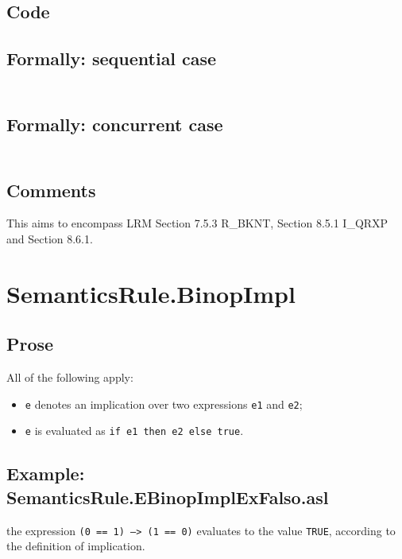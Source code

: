 \documentclass{book}
\begin{document}
  \subsection{Code}

  \subsection{Formally: sequential case}
  \begin{align}
  \end{align} 

  \subsection{Formally: concurrent case}
  \begin{align}
  \end{align} 

  \subsection{Comments}
  This aims to encompass LRM Section 7.5.3 R\_BKNT, Section 8.5.1 I\_QRXP and Section
  8.6.1.

\section{SemanticsRule.BinopImpl \label{sec:SemanticsRule.BinopImpl}}

  \subsection{Prose}
  All of the following apply:
  \begin{itemize}
  \item \texttt{e} denotes an implication over two expressions \texttt{e1} and \texttt{e2};
  \item \texttt{e} is evaluated as \texttt{if e1 then e2 else true}.
  \end{itemize}

  \subsection{Example: SemanticsRule.EBinopImplExFalso.asl}
the expression \texttt{(0 == 1) --> (1 == 0)} evaluates to the value \texttt{TRUE}, according to the definition of implication.
\end{document}
